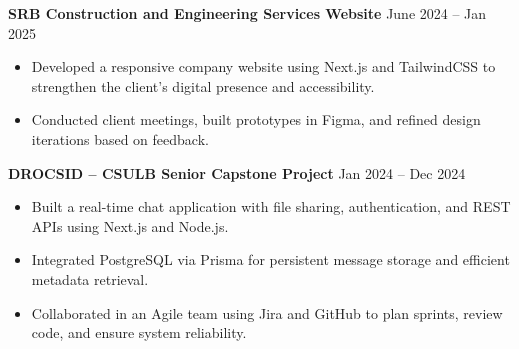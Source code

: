 \documentclass[a4paper,9.5pt]{article}
\newcommand{\dateright}[1]{\hfill {\small\textnormal{#1}}}
\begin{document}
\textbf{SRB Construction and Engineering Services Website} \dateright{June 2024 – Jan 2025}
\begin{itemize}
  \item Developed a responsive company website using Next.js and TailwindCSS to strengthen the client’s digital presence and accessibility.
  \item Conducted client meetings, built prototypes in Figma, and refined design iterations based on feedback.
\end{itemize}

\textbf{DROCSID – CSULB Senior Capstone Project} \dateright{Jan 2024 – Dec 2024}
\begin{itemize}
  \item Built a real-time chat application with file sharing, authentication, and REST APIs using Next.js and Node.js.
  \item Integrated PostgreSQL via Prisma for persistent message storage and efficient metadata retrieval.
  \item Collaborated in an Agile team using Jira and GitHub to plan sprints, review code, and ensure system reliability.
\end{itemize}

\end{document}
